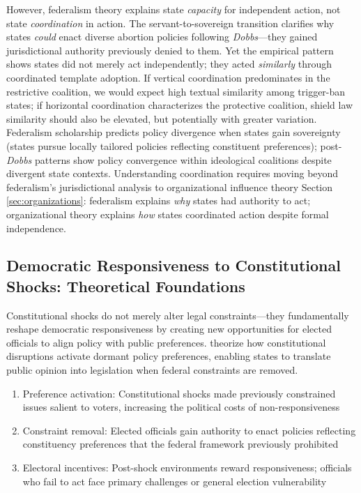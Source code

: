 However, federalism theory explains state \emph{capacity} for independent action, not state \emph{coordination} in action. The servant-to-sovereign transition clarifies why states \emph{could} enact diverse abortion policies following \emph{Dobbs}---they gained jurisdictional authority previously denied to them. Yet the empirical pattern shows states did not merely act independently; they acted \emph{similarly} through coordinated template adoption. If vertical coordination predominates in the restrictive coalition, we would expect high textual similarity among trigger-ban states; if horizontal coordination characterizes the protective coalition, shield law similarity should also be elevated, but potentially with greater variation. Federalism scholarship predicts policy divergence when states gain sovereignty (states pursue locally tailored policies reflecting constituent preferences); post-\emph{Dobbs} patterns show policy convergence within ideological coalitions despite divergent state contexts. Understanding coordination requires moving beyond federalism's jurisdictional analysis to organizational influence theory Section~ \ref{sec:organizations}: federalism explains \emph{why} states had authority to act; organizational theory explains \emph{how} states coordinated action despite formal independence.

\subsection{Democratic Responsiveness to Constitutional Shocks: Theoretical Foundations}
Constitutional shocks do not merely alter legal constraints---they fundamentally reshape democratic responsiveness by creating new opportunities for elected officials to align policy with public preferences. \textcite{camobrecoDemocraticResponsivenessPolicy2008} theorize how constitutional disruptions activate dormant policy preferences, enabling states to translate public opinion into legislation when federal constraints are removed.

\begin{enumerate}
    \item Preference activation:
    Constitutional shocks made previously constrained issues salient to voters, increasing the political costs of non-responsiveness
    \item Constraint removal: Elected officials gain authority to enact policies reflecting constituency preferences that the federal framework previously prohibited
    \item Electoral incentives: Post-shock environments reward responsiveness; officials who fail to act face primary challenges or general election vulnerability
\end{enumerate}

